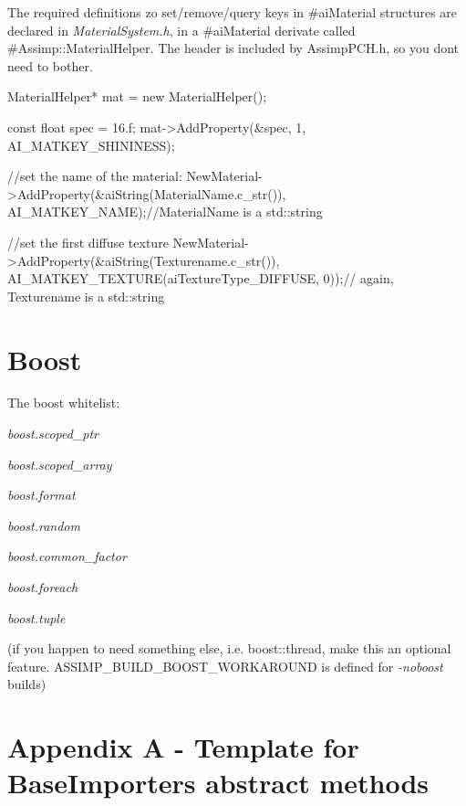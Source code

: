 The required definitions zo set/remove/query keys in \#ai\+Material structures are declared in {\itshape Material\+System.\+h}, in a \#ai\+Material derivate called \#\+Assimp\+::\+Material\+Helper. The header is included by Assimp\+P\+C\+H.\+h, so you don\textquotesingle{}t need to bother.


\begin{DoxyCode}
MaterialHelper* mat = \textcolor{keyword}{new} MaterialHelper();

\textcolor{keyword}{const} \textcolor{keywordtype}{float} spec = 16.f;
mat->AddProperty(&spec, 1, AI\_MATKEY\_SHININESS);

\textcolor{comment}{//set the name of the material:}
NewMaterial->AddProperty(&aiString(MaterialName.c\_str()), AI\_MATKEY\_NAME);\textcolor{comment}{//MaterialName is a std::string}

\textcolor{comment}{//set the first diffuse texture}
NewMaterial->AddProperty(&aiString(Texturename.c\_str()), AI\_MATKEY\_TEXTURE(aiTextureType\_DIFFUSE, 0));\textcolor{comment}{//
      again, Texturename is a std::string}
\end{DoxyCode}
\hypertarget{extend_boost}{}\section{Boost}\label{extend_boost}
The boost whitelist\+: 
\begin{DoxyItemize}
\item {\itshape boost.\+scoped\+\_\+ptr} 
\item {\itshape boost.\+scoped\+\_\+array} 
\item {\itshape boost.\+format}  
\item {\itshape boost.\+random}  
\item {\itshape boost.\+common\+\_\+factor}  
\item {\itshape boost.\+foreach}  
\item {\itshape boost.\+tuple} 
\end{DoxyItemize}

(if you happen to need something else, i.\+e. boost\+::thread, make this an optional feature. {\ttfamily A\+S\+S\+I\+M\+P\+\_\+\+B\+U\+I\+L\+D\+\_\+\+B\+O\+O\+S\+T\+\_\+\+W\+O\+R\+K\+A\+R\+O\+U\+N\+D} is defined for {\itshape -\/noboost} builds)\hypertarget{extend_appa}{}\section{Appendix A -\/ Template for Base\+Importer\textquotesingle{}s abstract methods}\label{extend_appa}

